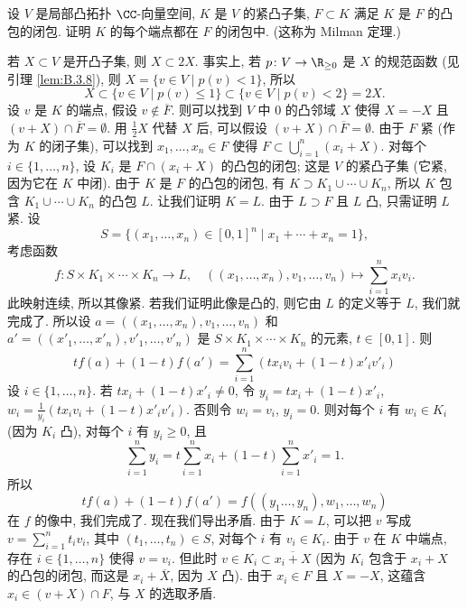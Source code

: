 \begin{exercise}[Milman 定理]
\label{ex:III.6.2.2}
设 $V$ 是局部凸拓扑 $\CC$-向量空间, $K$ 是 $V$ 的紧凸子集, $F \subset K$ 满足 $K$ 是 $F$ 的凸包的闭包. 证明 $K$ 的每个端点都在 $F$ 的闭包中. (这称为 Milman 定理.)
\end{exercise}

\begin{solution}
若 $X \subset V$ 是开凸子集, 则 $X \subset 2X$. 事实上, 若 $p \colon V \to \R_{\geq 0}$ 是 $X$ 的规范函数 (见引理 \ref{lem:B.3.8}), 则 $X = \{v \in V \mid p(v) < 1\}$, 所以
\[
X \subset \{v \in V \mid p(v) \leq 1\} \subset \{v \in V \mid p(v) < 2\} = 2X.
\]
设 $v$ 是 $K$ 的端点, 假设 $v \notin \overline{F}$. 则可以找到 $V$ 中 $0$ 的凸邻域 $X$ 使得 $X = -X$ 且 $(v + X) \cap \overline{F} = \emptyset$. 用 $\frac{1}{2}X$ 代替 $X$ 后, 可以假设 $(v + X) \cap \overline{F} = \emptyset$.
由于 $F$ 紧 (作为 $K$ 的闭子集), 可以找到 $x_1, \ldots, x_n \in F$ 使得 $F \subset \bigcup_{i=1}^n(x_i + X)$. 对每个 $i \in \{1, \ldots, n\}$, 设 $K_i$ 是 $F \cap (x_i + X)$ 的凸包的闭包; 这是 $V$ 的紧凸子集 (它紧, 因为它在 $K$ 中闭). 由于 $K$ 是 $F$ 的凸包的闭包, 有 $K \supset K_1 \cup \cdots \cup K_n$, 所以 $K$ 包含 $K_1 \cup \cdots \cup K_n$ 的凸包 $L$. 让我们证明 $K = L$. 由于 $L \supset F$ 且 $L$ 凸, 只需证明 $L$ 紧. 设
\[
S = \{(x_1, \ldots, x_n) \in [0,1]^n \mid x_1 + \cdots + x_n = 1\},
\]
考虑函数
\[
f \colon S \times K_1 \times \cdots \times K_n \to L, \quad ((x_1, \ldots, x_n), v_1, \ldots, v_n) \longmapsto \sum_{i=1}^n x_iv_i.
\]
此映射连续, 所以其像紧. 若我们证明此像是凸的, 则它由 $L$ 的定义等于 $L$, 我们就完成了. 所以设 $a = ((x_1, \ldots, x_n), v_1, \ldots, v_n)$ 和 $a' = ((x'_1, \ldots, x'_n), v'_1, \ldots, v'_n)$ 是 $S \times K_1 \times \cdots \times K_n$ 的元素, $t \in [0,1]$. 则
\[
tf(a) + (1 - t)f(a') = \sum_{i=1}^n(tx_iv_i + (1 - t)x'_iv'_i)
\]
设 $i \in \{1, \ldots, n\}$. 若 $tx_i + (1 - t)x'_i \neq 0$, 令 $y_i = tx_i + (1 - t)x'_i$, $w_i = \frac{1}{y_i}(tx_iv_i + (1 - t)x'_iv'_i)$. 否则令 $w_i = v_i$, $y_i = 0$. 则对每个 $i$ 有 $w_i \in K_i$ (因为 $K_i$ 凸), 对每个 $i$ 有 $y_i \geq 0$, 且
\[
\sum_{i=1}^n y_i = t\sum_{i=1}^n x_i + (1 - t)\sum_{i=1}^n x'_i = 1.
\]
所以
\[
tf(a) + (1 - t)f(a') = f((y_1 \ldots, y_n), w_1, \ldots, w_n)
\]
在 $f$ 的像中, 我们完成了.
现在我们导出矛盾. 由于 $K = L$, 可以把 $v$ 写成 $v = \sum_{i=1}^n t_iv_i$, 其中 $(t_1, \ldots, t_n) \in S$, 对每个 $i$ 有 $v_i \in K_i$. 由于 $v$ 在 $K$ 中端点, 存在 $i \in \{1, \ldots, n\}$ 使得 $v = v_i$. 但此时 $v \in K_i \subset \overline{x_i + X}$ (因为 $K_i$ 包含于 $x_i + X$ 的凸包的闭包, 而这是 $x_i + \overline{X}$, 因为 $X$ 凸). 由于 $x_i \in F$ 且 $X = -X$, 这蕴含 $x_i \in (v + X) \cap F$, 与 $X$ 的选取矛盾.
\end{solution}

